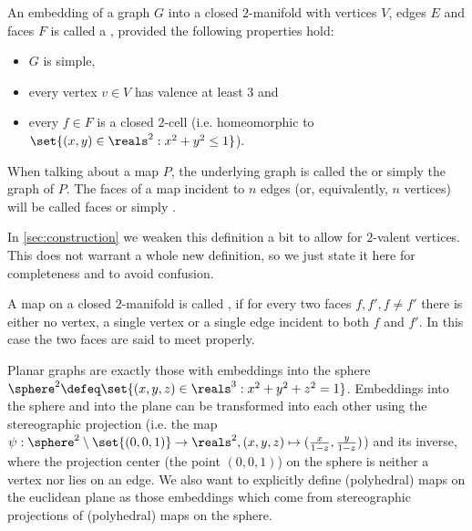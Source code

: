 \begin{definition} \label{def:map} An embedding of a graph $G$ into a closed $2$-manifold with vertices $V$, edges $E$ and faces $F$ is called a , provided the following properties hold:
  \begin{itemize}
  \item $G$ is simple,
  \item every vertex $v \in V$ has valence at least $3$ and
  \item every $f \in F$ is a closed $2$-cell (i.e. homeomorphic to $\set{(x, y) \in \reals^2 : x^2 + y^2 \leq 1}$).
  \end{itemize}
  When talking about a map $P$, the underlying graph is called the  or simply the graph of $P$. The faces of a map incident to $n$ edges (or, equivalently, $n$ vertices) will be called  faces or simply .
\end{definition}

\begin{remark}
  In \autoref{sec:construction} we weaken this definition a bit to allow for $2$-valent vertices. This does not warrant a whole new definition, so we just state it here for completeness and to avoid confusion.
\end{remark}

\begin{definition} \label{def:polymap} A map on a closed $2$-manifold is called , if for every two faces $f, f', f \neq f'$ there is either no vertex, a single vertex or a single edge incident to both $f$ and $f'$. In this case the two faces are said to meet properly.
\end{definition}

\begin{remark} Planar graphs are exactly those with embeddings into the sphere $\sphere^2 \defeq \set{(x, y, z) \in \reals^3 : x^2 + y^2 + z^2 = 1}$. Embeddings into the sphere and into the plane can be transformed into each other using the stereographic projection (i.e. the map $\psi: \sphere^2 \setminus \set{(0, 0, 1)} \to \reals^2, (x, y, z) \mapsto (\frac{x}{1-z}, \frac{y}{1-z})$) and its inverse, where the projection center (the point $(0, 0, 1)$) on the sphere is neither a vertex nor lies on an edge. We also want to explicitly define (polyhedral) maps on the euclidean plane as those embeddings which come from stereographic projections of (polyhedral) maps on the sphere.
\end{remark}

